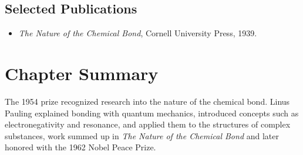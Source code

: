 \subsection*{Selected Publications}

\begin{itemize}

\item \emph{The Nature of the Chemical Bond}, Cornell University Press, 1939.

\end{itemize}

\clearpage

\section*{Chapter Summary}

The 1954 prize recognized research into the nature of the chemical bond. Linus Pauling explained bonding with quantum mechanics, introduced concepts such as electronegativity and resonance, and applied them to the structures of complex substances, work summed up in \emph{The Nature of the Chemical Bond} and later honored with the 1962 Nobel Peace Prize.

